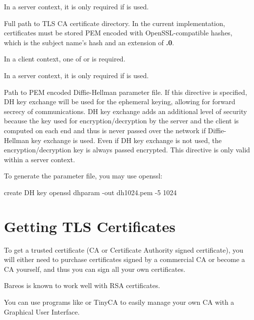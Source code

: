 \begin{description}
In a server context, it is only required if  is used.

%
Full path to TLS CA certificate directory.  In the current implementation,
certificates must be stored PEM encoded with OpenSSL-compatible hashes,
which is the subject name's hash and an extension of {\bf .0}.

In a client context, one of
 or 
is required.

In a server context, it is only required if  is used.


%
Path to PEM encoded Diffie-Hellman parameter file.  If this directive is
specified, DH key exchange will be used for the ephemeral keying, allowing
for forward secrecy of communications.  DH key exchange adds an additional
level of security because the key used for encryption/decryption by the
server and the client is computed on each end and thus is never passed over
the network if Diffie-Hellman key exchange is used.  Even if DH key
exchange is not used, the encryption/decryption key is always passed
encrypted.  This directive is only valid within a server context.

To generate the parameter file, you
may use openssl:

\begin{commands}{create DH key}
openssl dhparam -out dh1024.pem -5 1024
\end{commands}

\end{description}

\section{Getting TLS Certificates}

To get a trusted certificate (CA or Certificate Authority signed
certificate), you will either need to purchase certificates signed by a
commercial CA or become a CA
yourself, and thus you can sign all your own certificates.

Bareos is known to work well with RSA certificates.

You can use programs like  or TinyCA
to easily manage your own CA with a Graphical User Interface.



